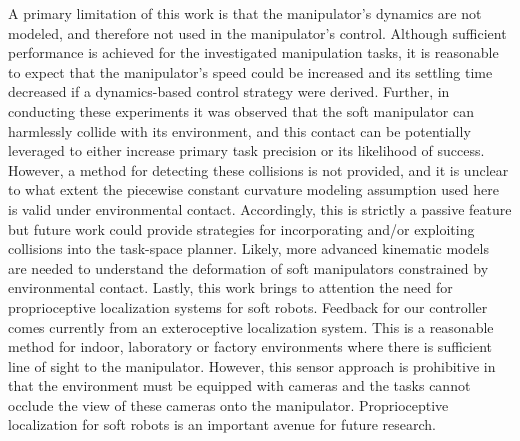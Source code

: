 A primary limitation of this work is that the manipulator's dynamics are not modeled, and therefore not used in the manipulator's control.
%
Although sufficient performance is achieved for the investigated manipulation tasks,  it is reasonable to expect that the manipulator's speed could be increased and its settling time decreased if a dynamics-based control strategy were derived.
%
Further, in conducting these experiments it was observed that the soft manipulator can harmlessly collide with its environment, and this contact can be potentially leveraged to either increase primary task precision or its likelihood of success.
%
However, a method for detecting these collisions is not provided, and it is unclear to what extent the piecewise constant curvature modeling assumption used here is valid under environmental contact.
%
Accordingly, this is strictly a passive feature but future work could provide strategies for incorporating and/or exploiting collisions into the task-space planner.
%
Likely, more advanced kinematic models are needed to understand the deformation of soft manipulators constrained by environmental contact.
%
Lastly, this work brings to attention the need for proprioceptive localization systems for soft robots.
%
Feedback for our controller comes currently from an exteroceptive localization system.
%
This is a reasonable method for indoor, laboratory or factory environments where there is sufficient line of sight to the manipulator.
%
However, this sensor approach is prohibitive in that the environment must be equipped with cameras and the tasks cannot occlude the view of these cameras onto the manipulator.
%
Proprioceptive localization for soft robots is an important avenue for future research.
